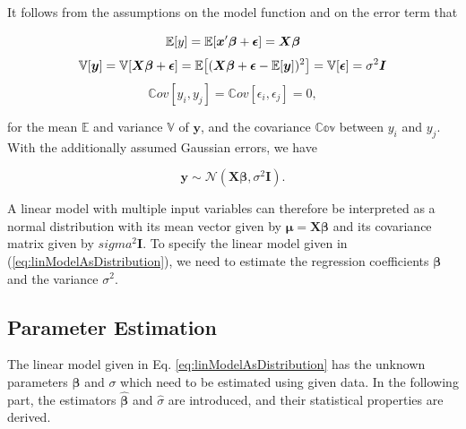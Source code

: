 \documentclass[10pt,a4paper]{article}
\begin{document}
It follows from the assumptions on the model function and on the error term that

\begin{equation}
	\mathbb E[y] = \mathbb E [\boldsymbol{x}'\boldsymbol{\beta} + \boldsymbol{\epsilon}] = \boldsymbol{X} \boldsymbol{\beta} \\
\end{equation}
\begin{equation}
	\mathbb V[\boldsymbol{y}] = \mathbb V[\boldsymbol{X} \boldsymbol{\beta} + \boldsymbol{\epsilon}] = \mathbb{E}\big[(\boldsymbol{X} \boldsymbol{\beta} + \boldsymbol{\epsilon} - \mathbb{E}[\boldsymbol{y}])^2\big] = \mathbb V[\boldsymbol{\epsilon}] = \sigma^2 \boldsymbol{I} \\
\end{equation}
\begin{equation}
	\mathbb Cov[y_i, y_j] = \mathbb Cov[\epsilon_i, \epsilon_j] = 0, 
\end{equation}
	
for the mean $\mathbb{E}$ and variance $\mathbb{V}$ of $\boldsymbol{y}$, and the covariance $\mathbb{Cov}$ between $y_i$ and $y_j$. With the additionally assumed Gaussian errors, we have

\begin{equation} \label{eq:linModelAsDistribution}
	\boldsymbol{y} \sim \mathcal N(\boldsymbol{X} \boldsymbol{\beta}, \sigma^2 \boldsymbol{I}).
\end{equation}

A linear model with multiple input variables can therefore be interpreted as a normal distribution with its mean vector given by $\boldsymbol{\mu} = \boldsymbol{X} \boldsymbol{\beta}$ and its covariance matrix given by $sigma^2 \boldsymbol{I}$. To specify the linear model given in (\ref{eq:linModelAsDistribution}), we need to estimate the regression coefficients $\boldsymbol{\beta}$ and the variance $\sigma^2$.

\subsection{Parameter Estimation}

The linear model given in Eq. \ref{eq:linModelAsDistribution} has the unknown parameters $\boldsymbol{\beta}$ and $\sigma$ which need to be estimated using given data. In the following part, the estimators $\boldsymbol{\hat{\beta}}$ and $\hat \sigma$ are introduced, and their statistical properties are derived. 
\end{document}
